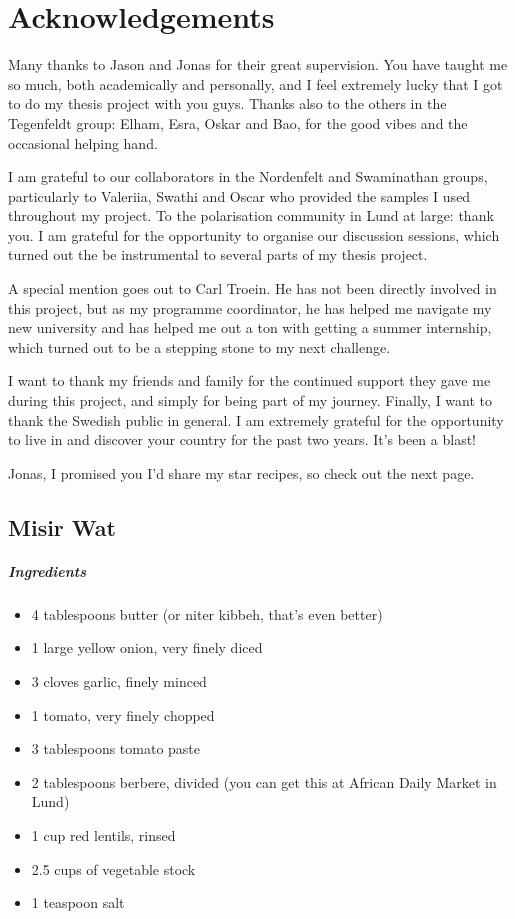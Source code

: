 \chapter{Acknowledgements}

Many thanks to Jason and Jonas for their great supervision. You have taught me so much, both academically and personally, and I feel extremely lucky that I got to do my thesis project with you guys. Thanks also to the others in the Tegenfeldt group: Elham, Esra, Oskar and Bao, for the good vibes and the occasional helping hand.

I am grateful to our collaborators in the Nordenfelt and Swaminathan groups, particularly to Valeriia, Swathi and Oscar who provided the samples I used throughout my project. To the polarisation community in Lund at large: thank you. I am grateful for the opportunity to organise our discussion sessions, which turned out the be instrumental to several parts of my thesis project.

A special mention goes out to Carl Troein. He has not been directly involved in this project, but as my programme coordinator, he has helped me navigate my new university and has helped me out a ton with getting a summer internship, which turned out to be a stepping stone to my next challenge.

I want to thank my friends and family for the continued support they gave me during this project, and simply for being part of my journey. Finally, I want to thank the Swedish public in general. I am extremely grateful for the opportunity to live in and discover your country for the past two years. It's been a blast!

\bigskip

\noindent Jonas, I promised you I'd share my star recipes, so check out the next page.
\newpage
\section*{Misir Wat}
\paragraph{Ingredients}
\begin{itemize}
	\item 4 tablespoons butter (or niter kibbeh, that's even better)
	\item 1 large yellow onion, very finely diced
	\item 3 cloves garlic, finely minced
	\item 1 tomato, very finely chopped
	\item 3 tablespoons tomato paste
	\item 2 tablespoons berbere, divided (you can get this at African Daily Market in Lund)
	\item 1 cup red lentils, rinsed
	\item 2.5 cups of vegetable stock
	\item 1 teaspoon salt
\end{itemize}


